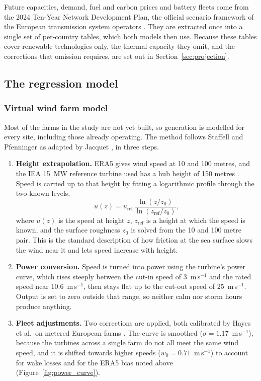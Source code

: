 Future capacities, demand, fuel and carbon prices and battery fleets come from
the 2024 Ten-Year Network Development Plan, the official scenario framework of
the European transmission system operators \cite{TYNDP2024}. They are extracted
once into a single set of per-country tables, which both models then use. Because these tables cover renewable technologies only, the thermal capacity
they omit, and the corrections that omission requires, are set out in
Section~\ref{sec:projection}.

\subsection{The regression model}\label{sec:empirical}

\subsubsection{Virtual wind farm model}\label{sec:vwf}

Most of the farms in the study are not yet built, so generation is modelled for
every site, including those already operating. The method follows Staffell and
Pfenninger \cite{Staffell2016} as adapted by Jacquet \cite{Jacquet2024}, in
three steps.

\begin{enumerate}
    \item \textbf{Height extrapolation.} ERA5 gives wind speed at 10 and 100
    metres, and the IEA 15~MW reference turbine used has a hub height of
    150 metres \cite{Gaertner2020}. Speed is carried up to that height by
    fitting a logarithmic profile through the two known levels,
    \begin{equation}
        u(z) = u_{\mathrm{ref}}\,\frac{\ln(z/z_0)}{\ln(z_{\mathrm{ref}}/z_0)},
        \label{eq:log_wind}
    \end{equation}
    where $u(z)$ is the speed at height $z$, $z_{\mathrm{ref}}$ is a height at
    which the speed is known, and the surface roughness $z_0$ is solved from the
    10 and 100 metre pair. This is the standard description of how friction at
    the sea surface slows the wind near it and lets speed increase with height.

    \item \textbf{Power conversion.} Speed is turned into power using the
    turbine's power curve, which rises steeply between the cut-in speed of
    3~m\,s$^{-1}$ and the rated speed near 10.6~m\,s$^{-1}$, then stays flat up
    to the cut-out speed of 25~m\,s$^{-1}$. Output is set to zero outside that
    range, so neither calm nor storm hours produce anything.

    \item \textbf{Fleet adjustments.} Two corrections are applied, both
    calibrated by Hayes et al.\ on metered European farms \cite{Hayes2021}. The
    curve is smoothed ($\sigma = 1.17$~m\,s$^{-1}$), because the turbines across
    a single farm do not all meet the same wind speed, and it is shifted towards
    higher speeds ($w_0 = 0.71$~m\,s$^{-1}$) to account for wake losses and for
    the ERA5 bias noted above (Figure~\ref{fig:power_curve}).
\end{enumerate}

